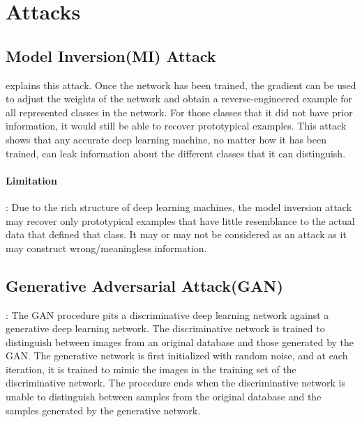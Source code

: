 \documentclass{article}
\begin{document}
\section{Attacks}
\subsection{Model Inversion(MI) Attack}
\cite{wang2016learning} explains this attack.
 Once the network has been trained, the gradient can be used to adjust the weights of the network and obtain a reverse-engineered example for all represented classes in the network. For those classes that it did not have prior information, it would still be able to recover prototypical examples. This attack shows that any accurate deep learning machine, no matter how it has been trained, can leak information about the different classes that it can distinguish.
 \paragraph{Limitation}: Due to the rich structure of deep learning machines, the model inversion attack may recover only prototypical examples that have little resemblance to the actual data that defined that class. It may or may not be considered as an attack as it may construct wrong/meaningless information.
 \subsection{Generative Adversarial Attack(GAN)}: The GAN procedure pits a discriminative deep learning network
 against a generative deep learning network. The discriminative network is trained to distinguish between images from an original database and those generated by the GAN. The generative network is first initialized with random noise, and at each iteration, it is trained to mimic the images in the training set of the discriminative network. The procedure ends when the discriminative network is unable to distinguish between samples from the original database and the samples generated by the generative network.
 
\end{document}
